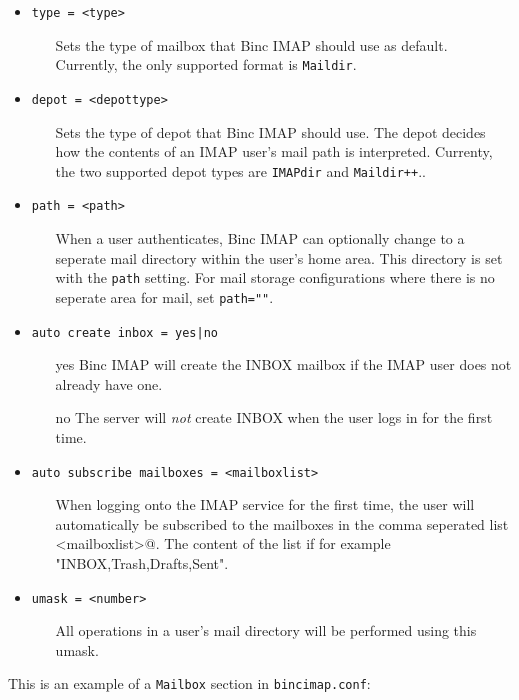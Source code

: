 \documentclass[11pt,a4paper,twoside,openright]{report}
\begin{document}
\begin{itemize}
\item \texttt{type = <type>}
  \begin{itemize}
    \item [] Sets the type of mailbox that Binc IMAP should
      use as default. Currently, the only supported format is
      \texttt{Maildir}.
  \end{itemize}
\item \texttt{depot = <depottype>}
  \begin{itemize}
    \item [] Sets the type of depot that Binc IMAP should use. The
      depot decides how the contents of an IMAP user's mail path is
      interpreted. Currenty, the two supported depot types are
      \texttt{IMAPdir} and \texttt{Maildir++}..
  \end{itemize}
\item \texttt{path = <path>}
  \begin{itemize}
    \item [] When a user authenticates, Binc IMAP can optionally
      change to a seperate mail directory within the user's home area.
      This directory is set with the \texttt{path} setting. For mail
      storage configurations where there is no seperate area for mail,
      set \texttt{path=""}.
  \end{itemize}
\item \texttt{auto create inbox = yes{|}no}
  \begin{itemize}
    \item [yes] Binc IMAP will create the INBOX mailbox if the IMAP
      user does not already have one.
    \item [no] The server will \textit{not} create INBOX when the user
      logs in for the first time.
  \end{itemize}
\item \texttt{auto subscribe mailboxes = <mailboxlist>}
  \begin{itemize}
    \item [] When logging onto the IMAP service for the first time,
      the user will automatically be subscribed to the mailboxes in
      the comma seperated list \Verb@<mailboxlist>@. The content of
      the list if for example "INBOX,Trash,Drafts,Sent".
  \end{itemize}
\item \texttt{umask = <number>}
  \begin{itemize}
    \item [] All operations in a user's mail directory will be
      performed using this umask.
  \end{itemize}


\end{itemize}
This is an example of a \texttt{Mailbox} section in
\texttt{bincimap.conf}:
\end{document}
